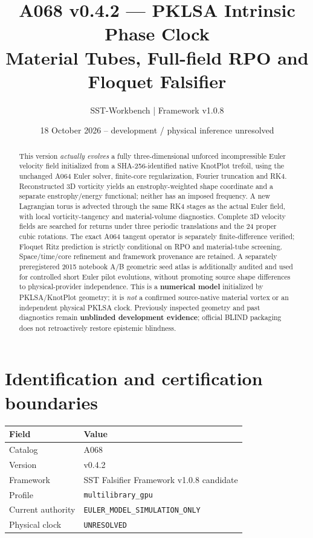 \documentclass[11pt,a4paper]{article}
\title{A068 v0.4.2 --- PKLSA Intrinsic Phase Clock\\Material Tubes, Full-field RPO and Floquet Falsifier}
\author{SST-Workbench | Framework v1.0.8}
\date{18 October 2026 -- development / physical inference unresolved}
\begin{document}
\maketitle
\begin{abstract}
This version \emph{actually evolves} a fully three-dimensional unforced incompressible Euler velocity field initialized from a SHA-256-identified native KnotPlot trefoil, using the unchanged A064 Euler solver, finite-core regularization, Fourier truncation and RK4. Reconstructed 3D vorticity yields an enstrophy-weighted shape coordinate and a separate enstrophy/energy functional; neither has an imposed frequency. A new Lagrangian torus is advected through the same RK4 stages as the actual Euler field, with local vorticity-tangency and material-volume diagnostics. Complete 3D velocity fields are searched for returns under three periodic translations and the 24 proper cubic rotations. The exact A064 tangent operator is separately finite-difference verified; Floquet Ritz prediction is strictly conditional on RPO and material-tube screening. Space/time/core refinement and framework provenance are retained. A separately preregistered 2015 notebook A/B geometric seed atlas is additionally audited and used for controlled short Euler pilot evolutions, without promoting source shape differences to physical-provider independence. This is a \textbf{numerical model} initialized by PKLSA/KnotPlot geometry; it is \emph{not} a confirmed source-native material vortex or an independent physical PKLSA clock. Previously inspected geometry and past diagnostics remain \textbf{unblinded development evidence}; official BLIND packaging does not retroactively restore epistemic blindness.
\end{abstract}

\section{Identification and certification boundaries}
\begin{tabular}{ll}
\toprule Field & Value\\\midrule
Catalog & A068\\ Version & v0.4.2\\ Framework & SST Falsifier Framework v1.0.8 candidate\\
Profile & \texttt{multilibrary\_gpu}\\ Current authority & \texttt{EULER\_MODEL\_SIMULATION\_ONLY}\\
Physical clock & \texttt{UNRESOLVED}\\ \bottomrule
\end{tabular}
\end{document}
